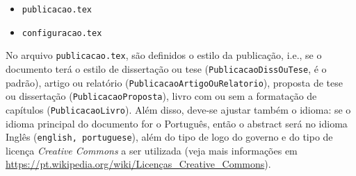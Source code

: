 \begin{itemize}
    \item {\tt publicacao.tex}
    \item {\tt configuracao.tex}
\end{itemize}

No arquivo {\tt publicacao.tex}, são definidos o estilo da publicação, i.e., se o documento terá o estilo de dissertação ou tese ({\tt PublicacaoDissOuTese}, é o padrão), artigo ou relatório ({\tt PublicacaoArtigoOuRelatorio}), proposta de tese ou dissertação ({\tt PublicacaoProposta}), livro com ou sem a formatação de capítulos ({\tt PublicacaoLivro}). Além disso, deve-se ajustar também o idioma: se o idioma principal do documento for o Português, então o abstract será no idioma Inglês ({\tt english, portuguese}), além do tipo de logo do governo e do tipo de licença \textit{Creative Commons} a ser utilizada (veja mais informações em \url{https://pt.wikipedia.org/wiki/Licenças_Creative_Commons}).

